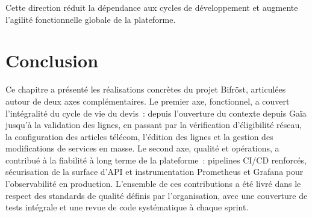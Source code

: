 Cette direction r\'eduit la d\'ependance aux cycles de d\'eveloppement et augmente l'agilit\'e fonctionnelle globale de la plateforme.
\section{Conclusion}

Ce chapitre a pr\'esent\'e les r\'ealisations concr\`etes du projet Bifr\"ost, articul\'ees autour de deux axes compl\'ementaires. Le premier axe, fonctionnel, a couvert l'int\'egralit\'e du cycle de vie du devis~: depuis l'ouverture du contexte depuis Ga\"ia jusqu'\`a la validation des lignes, en passant par la v\'erification d'\'eligibilit\'e r\'eseau, la configuration des articles t\'el\'ecom, l'\'edition des lignes et la gestion des modifications de services en masse. Le second axe, qualit\'e et op\'erations, a contribu\'e \`a la fiabilit\'e \`a long terme de la plateforme~: pipelines CI/CD renforc\'es, s\'ecurisation de la surface d'API et instrumentation Prometheus et Grafana pour l'observabilit\'e en production. L'ensemble de ces contributions a \'et\'e livr\'e dans le respect des standards de qualit\'e d\'efinis par l'organisation, avec une couverture de tests int\'egrale et une revue de code syst\'ematique \`a chaque sprint.